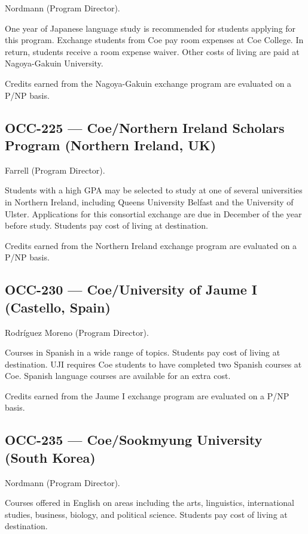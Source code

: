 \documentclass[
  letterpaper,
]{scrbook}
\begin{document}
Nordmann (Program Director).

One year of Japanese language study is recommended for students applying
for this program. Exchange students from Coe pay room expenses at Coe
College. In return, students receive a room expense waiver. Other costs
of living are paid at Nagoya-Gakuin University.

Credits earned from the Nagoya-Gakuin exchange program are evaluated on
a P/NP basis.

\subsection{OCC-225 --- Coe/Northern Ireland Scholars Program (Northern
Ireland,
UK)}\label{occ-225-coenorthern-ireland-scholars-program-northern-ireland-uk}

Farrell (Program Director).

Students with a high GPA may be selected to study at one of several
universities in Northern Ireland, including Queens University Belfast
and the University of Ulster. Applications for this consortial exchange
are due in December of the year before study. Students pay cost of
living at destination.

Credits earned from the Northern Ireland exchange program are evaluated
on a P/NP basis.

\subsection{OCC-230 --- Coe/University of Jaume I (Castello,
Spain)}\label{occ-230-coeuniversity-of-jaume-i-castello-spain}

Rodríguez Moreno (Program Director).

Courses in Spanish in a wide range of topics. Students pay cost of
living at destination. UJI requires Coe students to have completed two
Spanish courses at Coe. Spanish language courses are available for an
extra cost.

Credits earned from the Jaume I exchange program are evaluated on a P/NP
basis.

\subsection{OCC-235 --- Coe/Sookmyung University (South
Korea)}\label{occ-235-coesookmyung-university-south-korea}

Nordmann (Program Director).

Courses offered in English on areas including the arts, linguistics,
international studies, business, biology, and political science.
Students pay cost of living at destination.
\end{document}
